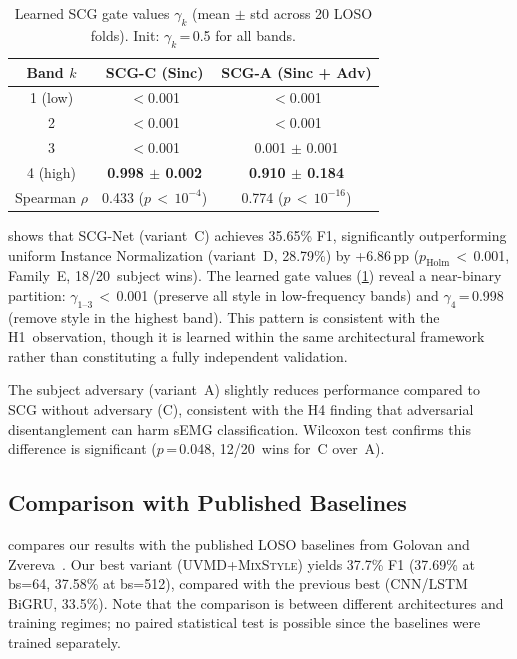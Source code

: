 \documentclass[conference]{IEEEtran}
\newcommand{\pp}{\,pp}
\newcommand{\mixstyle}{\textsc{MixStyle}}
\newcommand{\uvmd}{\textsc{UVMD}}
\begin{document}
\begin{table}[t]
\centering
\caption{Learned SCG gate values $\gamma_k$ (mean $\pm$ std across 20 LOSO folds). Init: $\gamma_k$\,=\,0.5 for all bands.}
\label{tab:scg_gates}
\begin{tabular}{ccc}
\toprule
Band $k$ & SCG-C (Sinc) & SCG-A (Sinc + Adv) \\
\midrule
1 (low)  & $<$0.001 & $<$0.001 \\
2        & $<$0.001 & $<$0.001 \\
3        & $<$0.001 & 0.001 $\pm$ 0.001 \\
4 (high) & \textbf{0.998 $\pm$ 0.002} & \textbf{0.910 $\pm$ 0.184} \\
\midrule
Spearman $\rho$ & 0.433 ($p$\,$<$\,$10^{-4}$) & 0.774 ($p$\,$<$\,$10^{-16}$) \\
\bottomrule
\end{tabular}
\end{table}

 shows that SCG-Net (variant~C) achieves 35.65\% F1, significantly outperforming uniform Instance Normalization (variant~D, 28.79\%) by +6.86\pp{} ($p_{\mathrm{Holm}}$\,$<$\,0.001, Family~E, 18/20~subject wins).
The learned gate values (\cref{tab:scg_gates}) reveal a near-binary partition: $\gamma_{1\text{--}3}$\,$<$\,0.001 (preserve all style in low-frequency bands) and $\gamma_4$\,=\,0.998 (remove style in the highest band).
This pattern is consistent with the H1~observation, though it is learned within the same architectural framework rather than constituting a fully independent validation.

The subject adversary (variant~A) slightly reduces performance compared to SCG without adversary (C), consistent with the H4 finding that adversarial disentanglement can harm sEMG classification.
Wilcoxon test confirms this difference is significant ($p$\,=\,0.048, 12/20~wins for~C over~A).

\subsection{Comparison with Published Baselines}

 compares our results with the published LOSO baselines from Golovan and Zvereva~\cite{golovan2025benchmark}.
Our best variant (\uvmd{}+\mixstyle{}) yields 37.7\% F1 (37.69\% at bs=64, 37.58\% at bs=512), compared with the previous best (CNN/LSTM BiGRU, 33.5\%).
Note that the comparison is between different architectures and training regimes; no paired statistical test is possible since the baselines were trained separately.
\end{document}
